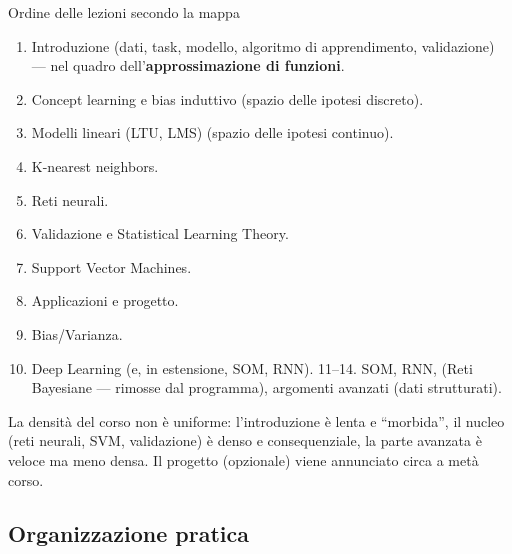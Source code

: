 \begin{boxnote}{Ordine delle lezioni secondo la mappa}

\begin{enumerate}
\def\labelenumi{\arabic{enumi}.}
\tightlist
\item
  Introduzione (dati, task, modello, algoritmo di apprendimento,
  validazione) --- nel quadro dell'\textbf{approssimazione di funzioni}.
\item
  Concept learning e bias induttivo (spazio delle ipotesi discreto).
\item
  Modelli lineari (LTU, LMS) (spazio delle ipotesi continuo).
\item
  K-nearest neighbors.
\item
  Reti neurali.
\item
  Validazione e Statistical Learning Theory.
\item
  Support Vector Machines.
\item
  Applicazioni e progetto.
\item
  Bias/Varianza.
\item
  Deep Learning (e, in estensione, SOM, RNN). 11--14. SOM, RNN, (Reti
  Bayesiane --- rimosse dal programma), argomenti avanzati (dati
  strutturati).
\end{enumerate}

\end{boxnote}

La densità del corso non è uniforme: l'introduzione è lenta e
``morbida'', il nucleo (reti neurali, SVM, validazione) è denso e
consequenziale, la parte avanzata è veloce ma meno densa. Il progetto
(opzionale) viene annunciato circa a metà corso.

\subsection{Organizzazione pratica}\label{organizzazione-pratica}

